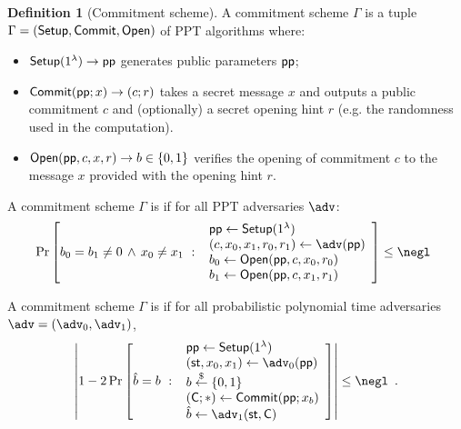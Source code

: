 \documentclass{article}
\theoremstyle{definition}
\newtheorem{definition}{Definition}
\newcommand{\ben}[1]{{\textcolor{green}{[Ben: #1]}}}
\newcommand{\alan}[1]{{\todo[color=blue!40!white]{Alan: #1}}}
\newcommand{\ben}[1]{}
\newcommand{\alan}[1]{}
\begin{document}
\begin{definition}[Commitment scheme]
A commitment scheme $\Gamma$ is a tuple $\Gamma = (\textsf{{Setup}}, \textsf{{Commit}}, \textsf{{Open}})$ of PPT algorithms where:
\begin{itemize}
    \item $\textsf{{Setup}}(1^\lambda) \rightarrow \textsf{pp}$ generates public parameters $\textsf{pp}$;
    \item $\textsf{{Commit}}(\textsf{pp}; x) \rightarrow (c; r)$ takes a secret message $x$ and outputs a public commitment $c$ and (optionally) a secret opening hint $r$ (e.g. the randomness used in the computation).
    \item $\textsf{{Open}}(\textsf{pp}, c, x, r) \rightarrow b \in \{0, 1\}$ verifies the opening of commitment $c$ to the message $x$ provided with the opening hint $r$. 
\end{itemize}

A commitment scheme $\Gamma$ is  if for all PPT adversaries $\adv$:
\[
    \Pr\left[
        b_0 = b_1 \neq 0 \, \wedge \, x_0 \neq x_1 \ : \
        \begin{array}{l}
             \params \gets \pro{Setup}(1^\lambda) \\
             (c, x_0, x_1, r_0, r_1) \gets \adv(\params) \\
             b_0 \gets \pro{Open}(\params, c, x_0, r_0) \\
             b_1 \gets \pro{Open}(\params, c, x_1, r_1) \\
        \end{array}
    \right] \leq \negl \enspace 
\]


A commitment scheme $\Gamma$ is  if for all probabilistic polynomial time adversaries $\adv=(\adv_0,\adv_1)$,
\[
    \left|
        1 - 2\Pr\left[
            \hat{b} = b \ : \
        \begin{array}{l}
             \params \gets \pro{Setup}(1^\lambda) \\
             (\state, x_0, x_1) \gets \adv_0(\params) \\
             b \sample \{0,1\} \\
             (\gr{C}; *) \gets \pro{Commit}(\params; x_b) \\
             \hat{b} \gets \adv_1(\state, \gr{C})
        \end{array}
        \right]
    \right| \leq \negl \enspace .
\]
\end{definition}
\end{document}
